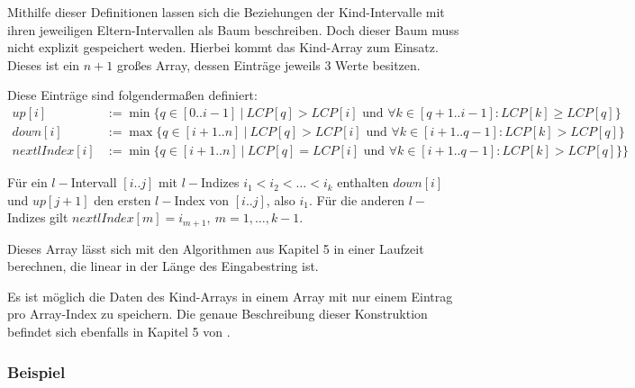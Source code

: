 Mithilfe dieser Definitionen lassen sich die Beziehungen der Kind-Intervalle mit ihren jeweiligen Eltern-Intervallen als Baum beschreiben.
Doch dieser Baum muss nicht explizit gespeichert weden. Hierbei kommt das Kind-Array zum Einsatz. Dieses ist ein $n + 1$ großes Array, dessen Einträge jeweils 3 Werte besitzen.

Diese Einträge sind folgendermaßen definiert:
\begin{align*}
	up[i] &:= \min\{q \in [0..i-1] \ |\ LCP[q] > LCP[i] \text{ und } \forall k \in [q + 1..i - 1] : LCP[k] \geq LCP[q]\}\\
	down[i] &:= \max\{q \in [i+1..n] \ |\ LCP[q] > LCP[i] \text{ und } \forall k \in [i + 1 .. q - 1] : LCP[k] > LCP[q]\}\\
	nextlIndex[i] &:= \min\{q \in [i+1..n] \ |\ LCP[q] = LCP[i] \text{ und } \forall k \in [i + 1 .. q - 1] : LCP[k] > LCP[q]\}\}
\end{align*}

Für ein $l-$Intervall $[i..j]$ mit $l-$Indizes $i_1 < i_2 < \dots < i_k$ enthalten $down[i]$ und $up[j+1]$ den ersten $l-$Index von $[i..j]$, also $i_1$. Für die anderen $l-$Indizes gilt $nextlIndex[m] = i_{m+1},\ m=1,\dots,k-1$.

Dieses Array lässt sich mit den Algorithmen aus \cite{abouelhoda_optimal_2002} Kapitel 5 in einer Laufzeit berechnen, die linear in der Länge des Eingabestring ist.

Es ist möglich die Daten des Kind-Arrays in einem Array mit nur einem Eintrag pro Array-Index zu speichern. Die genaue Beschreibung dieser Konstruktion befindet sich ebenfalls in Kapitel 5 von \cite{abouelhoda_optimal_2002}.

\subsubsection{Beispiel}

